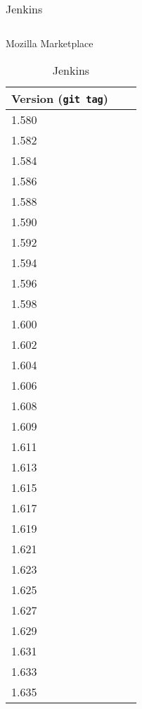 \begin{table}[h!]
{\begin{tabular}{l*{1}{l}r}
\hline
\end{tabular}
\caption{Mozilla Marketplace}
\label{fireplace}
}
\hfill
\parbox{.45\linewidth}{
\centering
\begin{tabular}{l*{1}{l}r}
\hline
Version (\texttt{git tag}) \\
\hline
1.580 \\
1.582 \\
1.584 \\
1.586 \\
1.588 \\
1.590 \\
1.592 \\
1.594 \\
1.596 \\
1.598 \\
1.600 \\
1.602 \\
1.604 \\
1.606 \\
1.608 \\
1.609 \\
1.611 \\
1.613 \\
1.615 \\
1.617 \\
1.619 \\
1.621 \\
1.623 \\
1.625 \\
1.627 \\
1.629 \\
1.631 \\
1.633 \\
1.635 \\

\hline
\end{tabular}
\caption{Jenkins}
\label{jenkins}

}

\end{table}

